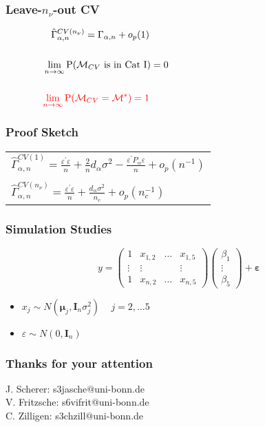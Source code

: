 \documentclass[20pt,mathserif]{beamer}
\begin{document}
\begin{frame}
\frametitle{Leave-$n_\nu$-out CV}
\begin{align*}
&\hspace{0.3cm}\hat{\Gamma}^{CV(n_\nu)}_{\alpha,n}=\Gamma_{\alpha,n}+o_p(1)&\hspace{5cm}&\\\\
&\lim_{n\rightarrow\infty}\mathrm{P}(\mathcal{M}_{CV} \text{ is in Cat I})=0&&\\\\
&{\color{red}\lim_{n\rightarrow\infty}\mathrm{P}(\mathcal{M}_{CV}=\mathcal{M}^\ast )=1}&&
\end{align*}
\end{frame}

\begin{frame}
\frametitle{Proof Sketch}
\setlength{\tabcolsep}{1pt}
\begin{tabular}{l}
$\hat{\Gamma}^{CV(1)}_{\alpha,n}=\frac{\varepsilon^\prime\varepsilon}{n}+\frac{2}{n}d_\alpha\sigma^2-\frac{\varepsilon^\prime P_\alpha\varepsilon}{n}+o_p(n^{-1})$\\\\
$\hat{\Gamma}^{CV(n_\nu)}_{\alpha,n}=\frac{\varepsilon^\prime\varepsilon}{n}+\frac{d_\alpha\sigma^2}{n_c}+o_p(n_c^{-1})$
\end{tabular}
\end{frame}

\begin{frame}
\frametitle{Simulation Studies}
\begin{equation*}
y =\begin{pmatrix}
1 & x_{1,2} & \ldots & x_{1,5}\\
\vdots & \vdots& & \vdots\\
1& x_{n,2} &\ldots & x_{n,5}
\end{pmatrix}
\begin{pmatrix}
\beta_1\\
\vdots\\
\beta_5
\end{pmatrix}
+\mathbf{\pmb{\varepsilon}}
\end{equation*}
\begin{itemize}
	\item $x_{j} \sim N(\mathbf{\pmb{\mu}}_j,\mathbf{I}_n\sigma^2_j)$ ~  $ j=2,\ldots5$
	\item $\varepsilon \sim N(0,\mathbf{I}_n)$
\end{itemize}
\end{frame}

\begin{frame}
\frametitle{Thanks for your attention }
J. Scherer: s3jasche$@$uni-bonn.de\\
V. Fritzsche: s6vifrit$@$uni-bonn.de\\
C. Zilligen: s3chzill$@$uni-bonn.de

\end{frame}
\end{document}
